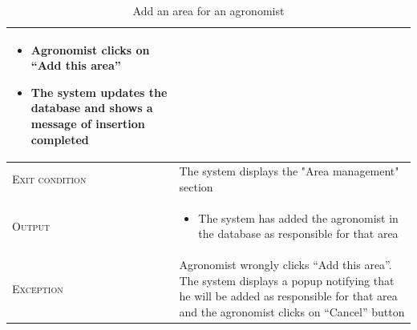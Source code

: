 \begin{table}[H]
\begin{tabular}[c]{|l|p{}|}
\begin{itemize}
                                    		\item Agronomist clicks on “Add this area”
                                    		\item The system updates the database and shows a message of insertion completed
                                        \end{itemize}\\
        \hline %
        \textsc{Exit condition}    &  The system displays the "Area management" section\\
    	\hline %
    	\textsc{Output}             &  \begin{itemize}
    	    \item The system has added the agronomist in the database as responsible for that area
    	\end{itemize}\\
    	\hline %
    	\textsc{Exception}         &  Agronomist wrongly clicks “Add this area”. The system displays a popup notifying that he will be added as responsible for that area and the agronomist clicks on “Cancel” button\\
    	\hline %
        
    \end{tabular}
    \caption{\label{tab:responsible_area_insertion}Add an area for an agronomist}
\end{table}

\newpage

